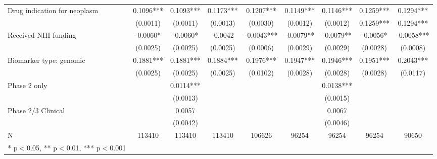 \begin{table}[htb]
\begin{tabular}{l*{8}c}
Drug indication for neoplasm&      0.1096***&      0.1093***&      0.1173***&      0.1207***&      0.1149***&      0.1146***&      0.1259***&      0.1294*** \\
                    &    (0.0011)   &    (0.0011)   &    (0.0013)   &    (0.0030)   &   (0.0012)   &    (0.0012)   &      0.1259***&      0.1294*** \\
Received NIH funding&     -0.0060*  &     -0.0060*  &     -0.0042   &     -0.0043***&     -0.0079** &     -0.0079** &     -0.0056*  &     -0.0058***\\
                    &    (0.0025)   &    (0.0025)   &    (0.0025)   &    (0.0006)   &    (0.0029)   &    (0.0029)   &    (0.0028)   &    (0.0008)   \\
Biomarker type: genomic&      0.1881***&      0.1881***&      0.1884***&      0.1976***&      0.1947***&      0.1946***&      0.1951***&      0.2043***\\
                    &    (0.0025)   &    (0.0025)   &    (0.0025)   &    (0.0102)   &    (0.0028)   &    (0.0028)   &    (0.0028)   &    (0.0117)   \\
Phase 2 only        &               &      0.0114***&               &               &               &      0.0138***&               &               \\
                    &               &    (0.0013)   &               &               &               &    (0.0015)   &               &               \\
Phase 2/3 Clinical  &               &      0.0057   &               &               &               &      0.0067   &               &               \\
                    &               &    (0.0042)   &               &               &               &    (0.0046)   &               &               \\
N                   &      113410   &      113410   &      113410   &      106626   &       96254   &       96254   &       96254   &       90650   \\
* p$<$0.05, ** p$<$0.01, *** p$<$0.001 \\

\end{tabular}
\end{table}

